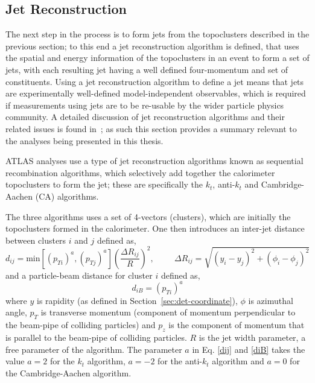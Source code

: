 \FloatBarrier
\subsection{Jet Reconstruction}
\label{sec:obj-jets_reco}

The next step in the process is to form jets from the topoclusters described in the previous section;
to this end a jet reconstruction algorithm is defined, that uses the spatial and energy information of the topoclusters in an event
to form a set of jets, with each resulting jet having a well defined four-momentum and set of constituents.
Using a jet reconstruction algorithm to define a jet means that jets are experimentally well-defined model-independent observables,
which is required if measurements using jets are to be re-usable by the wider particle physics community.
A detailed discussion of jet reconstruction algorithms
and their related issues is found in~\cite{obj-jets_reco_salam};
as such this section provides a summary relevant to the analyses being presented in this thesis.

ATLAS analyses use a type of jet reconstruction algorithms known as sequential recombination algorithms,
which selectively add together the calorimeter topoclusters to form the jet;
these are specifically the $k_t$, anti-$k_t$ and Cambridge-Aachen (CA) algorithms.

The three algorithms uses a set of 4-vectors (clusters), which are initially the topoclusters formed in the calorimeter.
One then introduces an inter-jet distance between clusters $i$ and $j$ defined as,
\begin{equation}
  d_{ij} = \text{min}
  [(p_{ Ti})^a, (p_{ Tj})^a]  \left(\frac{\Delta  R_{ij}}{R}\right) ^2, \hspace{1cm} \Delta R_{ij} = \sqrt{(y_{i} - y_{j})^2 + (\phi_{i} - \phi_{j})^2} \label{dij}
\end{equation}
\noindent and a particle-beam distance for cluster $i$ defined as,
\begin{equation}
  d_{iB} = (p_{Ti})^a \label{diB}
\end{equation}
where $y$  is rapidity (as defined in Section~\ref{sec:det-coordinate}), $\phi$ is azimuthal angle,
$p_T$ is transverse momentum (component of momentum perpendicular to the beam-pipe of colliding particles)
and $p_z$ is the component of momentum that is parallel to the beam-pipe of colliding particles.
$R$ is the jet width parameter, a free parameter of the algorithm.
The parameter $a$ in Eq. \eqref{dij} and \eqref{diB} takes the value $a = 2$ for the $k_t$ algorithm, $a = -2$ for the anti-$k_t$ algorithm 
and  $a = 0$ for the Cambridge-Aachen algorithm.

